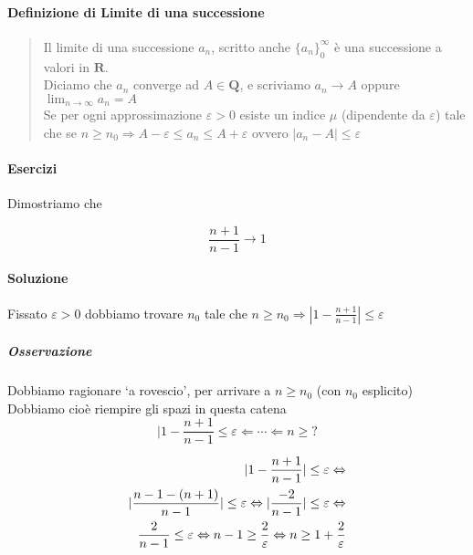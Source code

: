 \documentclass[12pt, a4paper]{article}
\begin{document}
\paragraph{Definizione di Limite di una successione} 
\begin{quote}
Il limite di una successione $a_n$, scritto anche ${\{a_n\}}^\infty_0$ \`e una successione a valori in $\mathbf{R}$. \\ 
Diciamo che $a_n$ converge ad $A \in \mathbf{Q}$, e scriviamo $a_n \to A$ oppure $\lim_{n \to \infty} a_n = A$ \\
Se per ogni approssimazione $\varepsilon > 0$ esiste un indice $\mu$ (dipendente da $\varepsilon$) tale che se $n \geq n_0 \Rightarrow A - \varepsilon \leq a_n \leq A + \varepsilon$ ovvero $ | a_n - A | \leq \varepsilon$
\end{quote}

\paragraph{Esercizi} Dimostriamo che 

\begin{equation*}
    \frac{n+1}{n-1} \to 1
\end{equation*}

\paragraph{Soluzione} Fissato $\varepsilon > 0$ dobbiamo trovare $n_0$ tale che $n \geq n_0 \Rightarrow |1 - \frac{n+1}{n-1}| \leq \varepsilon$  

\subparagraph{Osservazione} Dobbiamo ragionare `a rovescio', per arrivare a $ n \geq n_0$ (con $n_0$ esplicito) \\ Dobbiamo cio\`e riempire gli spazi in questa catena
\begin{equation*}
    | 1 - \frac{n+1}{n-1} \leq \varepsilon \Leftarrow \cdots \Leftarrow n \geq?
\end{equation*}

\begin{eqnarray*}
    |1- \frac{n+1}{n-1}| \leq \varepsilon \Leftrightarrow \endline
    |\frac{n-1-(n+1)}{n-1}| \leq \varepsilon \Leftrightarrow 
    |\frac{-2}{n-1}| \leq \varepsilon \Leftrightarrow \\
    \frac{2}{n-1} \leq \varepsilon \Leftrightarrow 
    n - 1 \geq \frac{2}{\varepsilon} \Leftrightarrow 
    n \geq 1 + \frac{2}{\varepsilon}
\end{eqnarray*}
\end{document}
